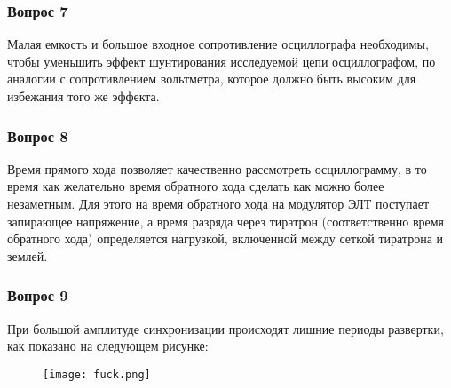 \subsubsection*{Вопрос 7}
Малая емкость и большое входное сопротивление осциллографа необходимы, чтобы уменьшить эффект шунтирования исследуемой цепи осциллографом, по аналогии с сопротивлением вольтметра, которое должно быть высоким для избежания того же эффекта.

\subsubsection*{Вопрос 8}
Время прямого хода позволяет качественно рассмотреть осциллограмму, в то время как желательно время обратного хода сделать как можно более незаметным. Для этого на время обратного хода на модулятор ЭЛТ поступает запирающее напряжение, а время разряда через тиратрон (соответственно время обратного хода) определяется нагрузкой, включенной между сеткой тиратрона и землей.

\subsubsection*{Вопрос 9}
При большой амплитуде синхронизации происходят лишние периоды развертки, как показано на следующем рисунке:
\begin{figure}[H]
	\centering
	\texttt{[image: fuck.png]}
	\label{fig:fuck}
\end{figure}




